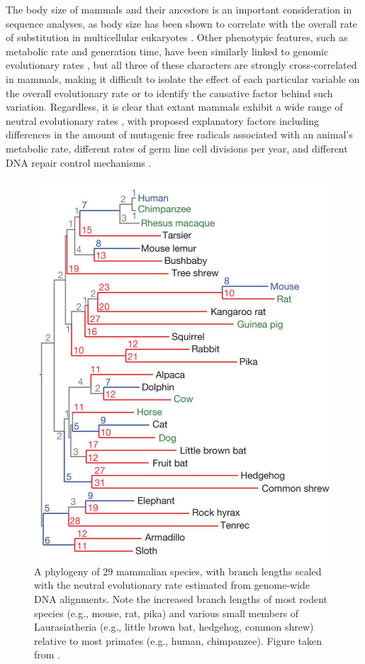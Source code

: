 The body size of mammals and their ancestors is an important
consideration in sequence analyses, as body size has been shown to
correlate with the overall rate of substitution in multicellular
eukaryotes
\citep{Mouse2002Initial,Hwang2004a,Welch2008,Galtier2009,Romiguier2010,
  Bromham2011}.  Other phenotypic features, such as metabolic rate and
generation time, have been similarly linked to genomic evolutionary
rates \citep{Martin1993,Nabholz2008}, but all three of these
characters are strongly cross-correlated in mammals, making it
difficult to isolate the effect of each particular variable on the
overall evolutionary rate or to identify the causative factor behind
such variation. Regardless, it is clear that extant mammals exhibit a
wide range of neutral evolutionary rates \citep{BinindaEmonds2007b},
with proposed explanatory factors including differences in the amount
of mutagenic free radicals associated with an animal's metabolic rate,
different rates of germ line cell divisions per year, and different
DNA repair control mechanisms \citep{Baer2007}.

\begin{figure}
\centering
\includegraphics[scale=0.3]{Figs/mammals_29.pdf}
\caption{A phylogeny of 29 mammalian species, with branch lengths
  scaled with the neutral evolutionary rate estimated from genome-wide
  DNA alignments. Note the increased branch lengths of most rodent
  species (e.g., mouse, rat, pika) and various small members of
  Laurasiatheria (e.g., little brown bat, hedgehog, common shrew)
  relative to most primates (e.g., human, chimpanzee). Figure taken
  from \citet{LindbladToh2011}.}
\label{fig_mammals_29}
\end{figure}

